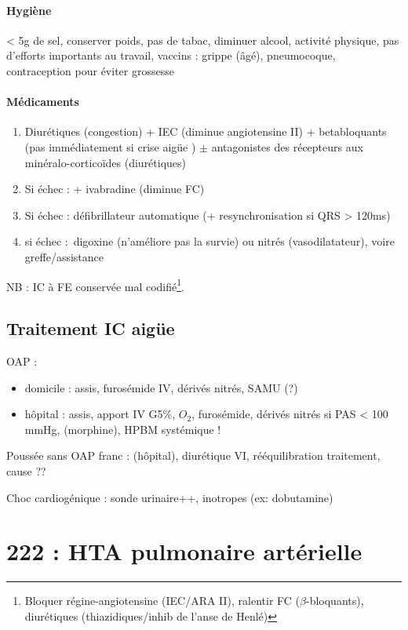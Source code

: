 \documentclass{article}
\begin{document}
\paragraph{Hygiène}
< 5g de sel, conserver poids, pas de tabac, diminuer alcool, activité physique,
pas d'efforts importants au travail, vaccins : grippe (âgé), pneumocoque,
contraception pour éviter grossesse

\paragraph{Médicaments}
\begin{enumerate}
  \item Diurétiques (congestion) + IEC (diminue angiotensine II) + betabloquants
    (\skull pas immédiatement si crise aigüe \danger{}) $\pm$ antagonistes des
    récepteurs aux minéralo-corticoïdes (diurétiques)
  \item Si échec : + ivabradine (diminue FC)
  \item Si échec : défibrillateur automatique (+ resynchronisation si QRS >
    120ms)
  \item si échec : digoxine (n'améliore pas la survie) ou nitrés (vasodilatateur), voire greffe/assistance
\end{enumerate}

NB : IC à FE conservée mal codifié\footnote{Bloquer régine-angiotensine (IEC/ARA II), ralentir FC
($\beta$-bloquants), diurétiques (thiazidiques/inhib de l'anse de Henlé)}.

\subsection{Traitement IC aigüe}
OAP : 
\begin{itemize}
  \item domicile : assis, furosémide IV, dérivés nitrés, SAMU (?)
  \item hôpital : assis, apport IV G5\%, $O_2$, furosémide, dérivés nitrés si
    PAS < 100 mmHg, (morphine), HPBM systémique !
\end{itemize}
Poussée sans OAP franc : (hôpital), diurétique VI, rééquilibration traitement,
cause ??

Choc cardiogénique : sonde urinaire++, inotropes (ex: dobutamine)

\section{222 : HTA pulmonaire artérielle}%
\label{sec:hta_pulmonaire_arterielle}
\end{document}

